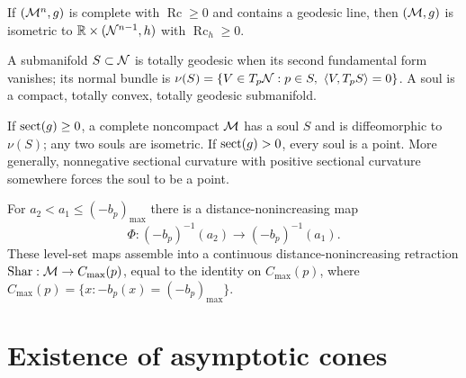 \begin{theorem}
\label{thm:chow-iii-i18-splitting}
If $(\mathcal M^n,g)$ is complete with $\operatorname{Rc}\ge0$ and contains a geodesic
line, then $(\mathcal M,g)$ is isometric to $\mathbb R\times(\mathcal N^{n-1},h)$ with
$\operatorname{Rc}_h\ge0$.
\end{theorem}

\begin{definition}[Soul]
\label{def:chow-iii-i20-i21-soul}
A submanifold $S\subset\mathcal N$ is totally geodesic when its second fundamental
form vanishes; its normal bundle is
$\nu(S)=\{V\in T_p\mathcal N:p\in S,\ \langle V,T_pS\rangle=0\}$.  A soul is a
compact, totally convex, totally geodesic submanifold.
\end{definition}

\begin{theorem}
\label{thm:chow-iii-i22-i23-soul}
If $\operatorname{sect}(g)\ge0$, a complete noncompact $\mathcal M$ has a soul $S$ and is
diffeomorphic to $\nu(S)$; any two souls are isometric.  If $\operatorname{sect}(g)>0$,
every soul is a point.  More generally, nonnegative sectional curvature with
positive sectional curvature somewhere forces the soul to be a point.
\end{theorem}

\begin{theorem}
\label{thm:chow-iii-i24-i25-sharafutdinov}
For $a_2<a_1\le(-b_p)_{\max}$ there is a distance-nonincreasing map
\[
\Phi:(-b_p)^{-1}(a_2)\longrightarrow(-b_p)^{-1}(a_1).
\]
These level-set maps assemble into a continuous distance-nonincreasing
retraction $\operatorname{Shar}:\mathcal M\to C_{\max}(p)$, equal to the identity on $C_{\max}(p)$,
where $C_{\max}(p)=\{x:-b_p(x)=(-b_p)_{\max}\}$.
\end{theorem}

\section{Existence of asymptotic cones}


